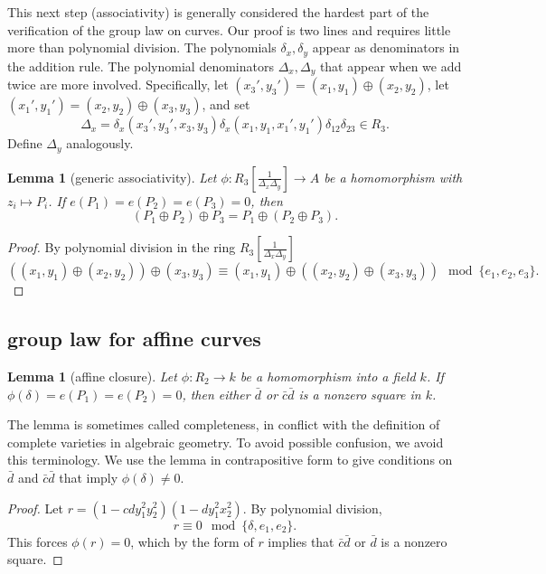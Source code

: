 \documentclass[12pt]{article}
\newtheorem{lemma}[theorem]{Lemma}
\newcommand{\f}[1]{\frac{1}{#1}}
\begin{document}
This next step (associativity) is generally considered the hardest
part of the verification of the group law on curves.  Our proof is two
lines and requires little more than polynomial division.  The
polynomials $\delta_x,\delta_y$ appear as denominators in the addition
rule.  The polynomial denominators $\Delta_x,\Delta_y$ that appear
when we add twice are more involved.  Specifically, let $
(x_3',y_3')=(x_1,y_1) \oplus (x_2,y_2)$, let $(x_1',y_1')=(x_2,y_2)
\oplus (x_3,y_3) $, and set
\[
\Delta_x = \delta_x(x_3',y_3',x_3,y_3)
\delta_x(x_1,y_1,x_1',y_1')\delta_{12}\delta_{23}\in R_3.
\]
Define $\Delta_y$ analogously.

\begin{lemma}[generic associativity] \label{lemma:assoc} Let
  $\phi:R_3[\f{\Delta_x\Delta_y}]\to A$ be a homomorphism with
  $z_i\mapsto P_i$.  If $e(P_1)=e(P_2)=e(P_3)=0$, then
\[
(P_1 \oplus P_2)\oplus P_3 = 
P_1 \oplus (P_2\oplus P_3).
\]
\end{lemma}

\begin{proof} By polynomial division in the
  ring $R_3[\f{\Delta_x\Delta_y}]$
\[
((x_1,y_1)\oplus (x_2,y_2)) \oplus (x_3,y_3)\equiv
(x_1,y_1)\oplus ((x_2,y_2) \oplus (x_3,y_3)) \mod \{e_1,e_2,e_3\}.
\]
\end{proof}

\subsection{group law for affine curves}

\begin{lemma}[affine closure] \label{lemma:affine} Let $\phi:R_2\to k$
  be a homomorphism into a field $k$.  If $\phi(\delta)=e(P_1)=e(P_2)=0$, 
  	then either $\bar d$ or $\bar c \bar d$ is a nonzero square
  in $k$.
\end{lemma}

The lemma is sometimes called completeness, in conflict with the
definition of complete varieties in algebraic geometry.  To avoid
possible confusion, we avoid this terminology.  We use the lemma in
contrapositive form to give conditions on $\bar d$ and $\bar c\bar d$ that
imply $\phi(\delta)\ne0$.

\begin{proof} 
  Let $r = (1 - c d y_1^2 y_2 ^2) (1 - d y_1^2 x_2^2)$.  By polynomial
  division,
\begin{equation}\label{eqn:squares}
  r \equiv 0 \mod \{\delta,e_1,e_2\}.
\end{equation}
This forces $\phi(r)=0$, which by the form of $r$ implies that $\bar
c\bar d$ or $\bar d$ is a nonzero square.
\end{proof}
\end{document}
